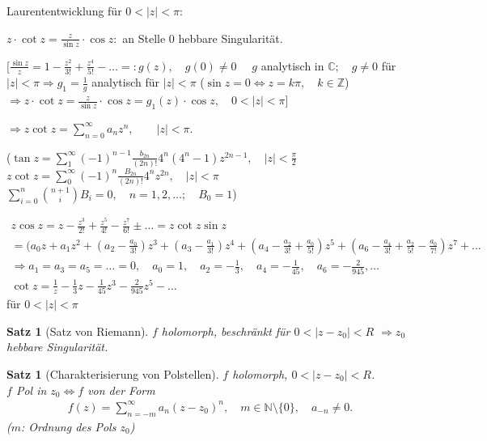 \documentclass[ngerman,halfparskip]{scrartcl}
\newtheorem*{satz}{Satz}
\newtheorem*{satz*}{Satz}
\theoremstyle{definition}
\def\C{\mathbb C}
\def\Z{\mathbb Z}
\def\N{\mathbb N}
\begin{document}
Laurententwicklung für $0<|z|<\pi:$

$z\cdot \cot z=\frac z{\sin z}\cdot \cos z:$ an Stelle $0$ hebbare Singularität.

[$\frac{\sin z}z=1-\frac{z^2}{3!}+\frac{z^4}{5!}-\ldots=:g(z), \quad g(0)\neq 0 \quad$
$g$ analytisch in $\C; \quad g\neq 0$ für $|z|<\pi \Rightarrow g_1=\frac 1g$ analytisch für $|z|<\pi$ ($\sin z = 0 \Leftrightarrow z=k\pi, \quad k\in\Z$)\\
$\Rightarrow z\cdot \cot z= \frac z{\sin z} \cdot \cos z= g_1(z)\cdot \cos z, \quad 0<|z|<\pi$]

$\Rightarrow z\cot z = \sum\limits_{n=0}^\infty a_nz^n, \qquad |z|<\pi$.

($\tan z= \sum\limits_1^\infty (-1)^{n-1}\frac{b_{2n}}{(2n)!}4^n(4^n-1)z^{2n-1}, \quad |z|<\frac \pi 2$\\
$z\cot z=\sum\limits_0^\infty(-1)^n\frac{B_{2n}}{(2n)!}4^nz^{2n}, \quad |z|<\pi$\\
$\sum_{i=0}^n \binom{n+1}{i}B_i=0, \quad n=1,2,\ldots ; \quad B_0=1$)

\begin{gather*} z\cos z =z-\frac{z^3}{2!}+\frac{z^5}{4!}-\frac{z^7}{6!}\pm \ldots =z\cot z \sin z \\
=(a_0z+a_1 z^2 +(a_2-\frac{a_0}{3!})z^3+(a_3-\frac{a_1}{3!})z^4+(a_4-\frac{a_2}{3!}+\frac{a_0}{5!})z^5+ (a_6-\frac{a_4}{3!}+\frac{a_2}{5!}-\frac{a_0}{7!})z^7+\ldots\\
\Rightarrow a_1=a_3=a_5=\ldots =0, \quad a_0=1,\quad a_2=-\frac 13, \quad a_4=-\frac 1{45},\quad a_6=-\frac 2{945}, \ldots\\
\cot z=\frac 1z-\frac 13z-\frac 1{45}z^3-\frac 2{945}z^5-\ldots
\end{gather*}
für $0<|z|<\pi$

\begin{satz*}[Satz von Riemann]
$f$ holomorph, beschränkt für $0<|z-z_0|<R$
$\Rightarrow z_0$ hebbare Singularität.
\end{satz*}

\begin{satz}[Charakterisierung von Polstellen]
$f$ holomorph, $0<|z-z_0|<R$. \\
$f$ Pol in $z_0 \Leftrightarrow f$ von der Form
\begin{gather*}
f(z)=\sum\limits_{n=-m}^\infty a_n(z-z_0)^n, \quad m\in\N\setminus\{0\}, \quad a_{-n}\neq 0.
\end{gather*}
($m$: Ordnung des Pols $z_0$)
\end{satz}
\end{document}
